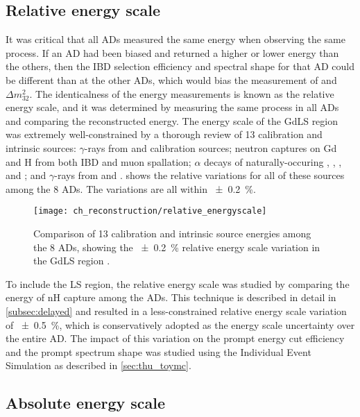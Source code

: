 \subsection{Relative energy scale}
\label{subsec:rel_energyscale}

It was critical that all ADs measured the same energy when observing the same process.
If an AD had been biased and returned a higher or lower energy than the others,
then the IBD selection efficiency and spectral shape for that AD
could be different than at the other ADs,
which would bias the measurement of \thetaot{} and $\Delta m^2_{32}$.
The identicalness of the energy measurements is known as the relative energy scale,
and it was determined by measuring the same process in all ADs and comparing
the reconstructed energy.
The energy scale of the GdLS region was extremely well-constrained
by a thorough review of 13 calibration and intrinsic sources:
$\gamma$-rays from  and  calibration sources;
neutron captures on Gd and H from both IBD and muon spallation;
$\alpha$ decays of naturally-occuring ,
, , and ;
and $\gamma$-rays from  and  \cite{ngd2016}.
 shows the relative variations
for all of these sources among the 8 ADs.
The variations are all within \SI{+-0.2}{\percent}.

\begin{figure}
    \centering
    \texttt{[image: ch\_reconstruction/relative\_energyscale]}
    \caption[Relative energy scale for GdLS volume]{
        Comparison of 13 calibration and intrinsic source energies
        among the 8 ADs, showing the \SI{+-0.2}{\percent}
        relative energy scale variation in the GdLS region
        \cite{ngd2016}.
    }
    \label{fig:gdls_rel_energyscale}
\end{figure}

To include the LS region, the relative energy scale was studied
by comparing the energy of nH capture among the ADs.
This technique is described in detail in \cref{subsec:delayed}
and resulted in a less-constrained relative energy scale variation
of \SI{+-0.5}{\percent}, which is conservatively adopted
as the energy scale uncertainty over the entire AD.
The impact of this variation on the prompt energy cut efficiency
and the prompt spectrum shape
was studied using the Individual Event Simulation
as described in \cref{sec:thu_toymc}.

\subsection{Absolute energy scale}
\label{subsec:abs_energyscale}


